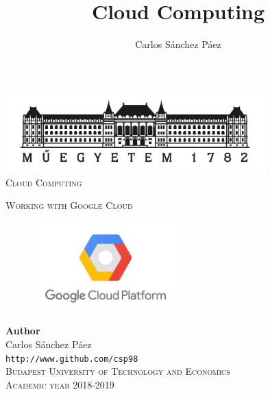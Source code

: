 \documentclass[12pt,english]{article}
\title{Cloud Computing}
\author{Carlos Sánchez Páez}
\begin{document}
\begin{titlepage}

 \newlength{\centeroffset}
 \setlength{\centeroffset}{-0.5\oddsidemargin}
 \addtolength{\centeroffset}{0.5\evensidemargin}
 \thispagestyle{empty}

 \noindent\hspace*{\centeroffset}
 \begin{minipage}{\textwidth}

  \centering
  \includegraphics[width=0.75\textwidth]{bme_logo.jpg}\\[1.4cm]

  \textsc{ \Large Cloud Computing\\[3cm]}

  \textsc{\Huge Working with Google Cloud}\\[2cm]

  \begin{figure}[H]
    \centering
    \includegraphics[width=0.5\textwidth]{../img/logo}
  \end{figure}
 \end{minipage}


 \vspace{3cm}
 \noindent\hspace*{\centeroffset}
 \begin{minipage}{\textwidth}
  \centering

  \textbf{Author}\\ {Carlos Sánchez Páez}\\
  \texttt{http://www.github.com/csp98}\\[0.5cm]
  \textsc{Budapest University of Technology and Economics}\\
  \vspace{1cm}
  \textsc{Academic year 2018-2019}
 \end{minipage}
\end{titlepage}
\thispagestyle{empty}
\newpage
\tableofcontents{}
\thispagestyle{empty}
\newpage
\end{document}
